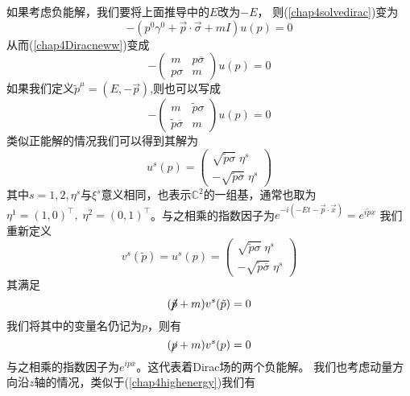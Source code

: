 如果考虑负能解，我们要将上面推导中的$E$改为$-E$，
则(\ref{chap4solvedirac})变为
\begin{equation}
    -(p^{0}\gamma^{0}+\vec{p}\cdot\vec{\sigma}+mI)u(p)=0
\end{equation}
从而(\ref{chap4Diracneww})变成
\begin{equation}
    -\left(\begin{array}{cc}
        m & {p\overline{\sigma}} \\
        {p\sigma} & m
    \end{array}\right)u(p)=0
\end{equation}
如果我们定义$\tilde{p}^{\mu}=(E,-\vec{p})$,则也可以写成
\begin{equation}
    -\left(\begin{array}{cc}
        m & {\tilde{p}\sigma} \\
        {\tilde{p}\overline{\sigma}} & m
    \end{array}\right)u(p)=0
\end{equation}
类似正能解的情况我们可以得到其解为
\begin{equation}
    u^{s}(p)=\left(\begin{array}{cc}
         \sqrt{\tilde{p}\sigma}\;\eta^{s}  \\
         -\sqrt{\tilde{p}\overline{\sigma}}\;\eta^{s} 
    \end{array}\right)
\end{equation}
其中$s=1,2,\eta^{s}$与$\xi^{s}$意义相同，也表示$\mathbb{C}^{2}$的一组基，通常也取为$\eta^{1}=(1,0)^{\top},\;\eta^{2}=(0,1)^{\top}$。与之相乘的指数因子为$e^{-i(-Et-\vec{p}\cdot\vec{x})}=e^{i\tilde{p}x}$
我们重新定义
\begin{equation}
\label{chap4diracV}
    v^{s}(\tilde{p})=u^{s}(p)=\left(\begin{array}{cc}
         \sqrt{\tilde{p}\sigma}\;\eta^{s}  \\
         -\sqrt{\tilde{p}\overline{\sigma}}\;\eta^{s} 
    \end{array}\right)
\end{equation}
其满足
\begin{equation}
    (\cancel{\tilde{p}}+m)v^{s}(\tilde{p})=0
\end{equation}
我们将其中的变量名仍记为$p$，则有
\begin{equation}
    (\cancel{p}+m)v^{s}(p)=0
\end{equation}
与之相乘的指数因子为$e^{ipx}$。这代表着Dirac场的两个负能解。
我们也考虑动量方向沿$z$轴的情况，类似于(\ref{chap4highenergy})我们有
